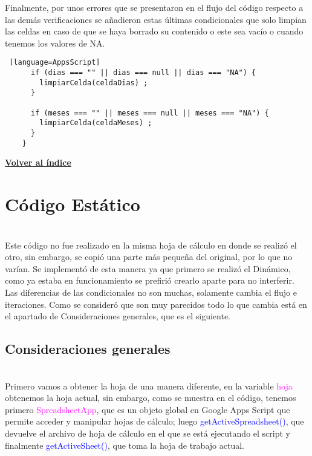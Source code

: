\documentclass[12pt]{article} %
\begin{document}
    Finalmente, por unos errores que se presentaron en el flujo del código respecto a las demás verificaciones se añadieron estas últimas condicionales que solo limpian las celdas en caso de que se haya borrado su contenido o este sea vacío o cuando tenemos los valores de NA.
    
    \begin{lstlisting} [language=AppsScript]
      if (dias === "" || dias === null || dias === "NA") {
        limpiarCelda(celdaDias) ;
      }

      if (meses === "" || meses === null || meses === "NA") {
        limpiarCelda(celdaMeses) ;
      }
    }
    \end{lstlisting}
    

            \begin{flushright}
                \hyperlink{toc}{\textbf{Volver al índice}}
            \end{flushright}


        

    \newpage

    \section*{Código Estático}
    \\

    Este código no fue realizado en la misma hoja de cálculo en donde se realizó el otro, sin embargo, se copió una parte más pequeña del original, por lo que no varían. Se implementó de esta manera ya que primero se realizó el Dinámico, como ya estaba en funcionamiento se prefirió crearlo aparte para no interferir. \\

    Las diferencias de las condicionales no son muchas, solamente cambia el flujo e iteraciones. Como se consideró que son muy parecidos todo lo que cambia está en el apartado de Consideraciones generales, que es el siguiente. \\


    
    \subsection*{Consideraciones generales}
    \\

    Primero vamos a obtener la hoja de una manera diferente, en la variable \textcolor{magenta}{hoja} obtenemos la hoja actual, sin embargo, como se muestra en el código, tenemos primero \textcolor{magenta}{SpreadsheetApp}, que es un objeto global en Google Apps Script que permite acceder y manipular hojas de cálculo; luego \textcolor{blue}{getActiveSpreadsheet()}, que devuelve el archivo de hoja de cálculo en el que se está ejecutando el script y finalmente \textcolor{blue}{getActiveSheet()}, que toma la hoja de trabajo actual.
\end{document}
